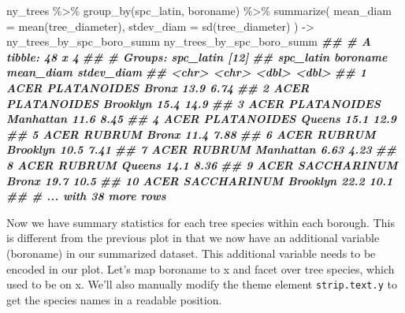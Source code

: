 \documentclass[
]{krantz}
\newenvironment{Shaded}{\begin{snugshade}}{\end{snugshade}}
\newcommand{\AttributeTok}[1]{\textcolor[rgb]{0.77,0.63,0.00}{#1}}
\newcommand{\DocumentationTok}[1]{\textcolor[rgb]{0.56,0.35,0.01}{\textbf{\textit{#1}}}}
\newcommand{\FunctionTok}[1]{\textcolor[rgb]{0.00,0.00,0.00}{#1}}
\newcommand{\NormalTok}[1]{#1}
\newcommand{\OtherTok}[1]{\textcolor[rgb]{0.56,0.35,0.01}{#1}}
\newcommand{\SpecialCharTok}[1]{\textcolor[rgb]{0.00,0.00,0.00}{#1}}
\begin{document}
\begin{Shaded}
\begin{Highlighting}[]
\NormalTok{ny\_trees }\SpecialCharTok{\%\textgreater{}\%}
  \FunctionTok{group\_by}\NormalTok{(spc\_latin, boroname) }\SpecialCharTok{\%\textgreater{}\%}
  \FunctionTok{summarize}\NormalTok{(}
    \AttributeTok{mean\_diam =} \FunctionTok{mean}\NormalTok{(tree\_diameter),}
    \AttributeTok{stdev\_diam =} \FunctionTok{sd}\NormalTok{(tree\_diameter)}
\NormalTok{  ) }\OtherTok{{-}\textgreater{}}\NormalTok{ ny\_trees\_by\_spc\_boro\_summ}
\NormalTok{ny\_trees\_by\_spc\_boro\_summ}
\DocumentationTok{\#\# \# A tibble: 48 x 4}
\DocumentationTok{\#\# \# Groups:   spc\_latin [12]}
\DocumentationTok{\#\#    spc\_latin        boroname  mean\_diam stdev\_diam}
\DocumentationTok{\#\#    \textless{}chr\textgreater{}            \textless{}chr\textgreater{}         \textless{}dbl\textgreater{}      \textless{}dbl\textgreater{}}
\DocumentationTok{\#\#  1 ACER PLATANOIDES Bronx         13.9        6.74}
\DocumentationTok{\#\#  2 ACER PLATANOIDES Brooklyn      15.4       14.9 }
\DocumentationTok{\#\#  3 ACER PLATANOIDES Manhattan     11.6        8.45}
\DocumentationTok{\#\#  4 ACER PLATANOIDES Queens        15.1       12.9 }
\DocumentationTok{\#\#  5 ACER RUBRUM      Bronx         11.4        7.88}
\DocumentationTok{\#\#  6 ACER RUBRUM      Brooklyn      10.5        7.41}
\DocumentationTok{\#\#  7 ACER RUBRUM      Manhattan      6.63       4.23}
\DocumentationTok{\#\#  8 ACER RUBRUM      Queens        14.1        8.36}
\DocumentationTok{\#\#  9 ACER SACCHARINUM Bronx         19.7       10.5 }
\DocumentationTok{\#\# 10 ACER SACCHARINUM Brooklyn      22.2       10.1 }
\DocumentationTok{\#\# \# ... with 38 more rows}
\end{Highlighting}
\end{Shaded}

Now we have summary statistics for each tree species within each borough. This is different from the previous plot in that we now have an additional variable (boroname) in our summarized dataset. This additional variable needs to be encoded in our plot. Let's map boroname to x and facet over tree species, which used to be on x. We'll also manually modify the theme element \texttt{strip.text.y} to get the species names in a readable position.
\end{document}
